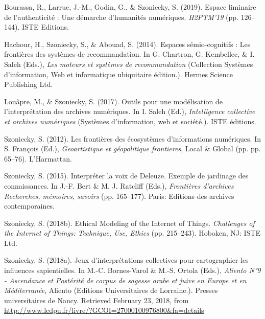 \documentclass[
  a4paper,
  DIV=11,
  numbers=noendperiod]{scrreprt}
\newlength{\cslhangindent}
\newenvironment{CSLReferences}[2] %
 {\begin{list}{}{%
  \setlength{\itemindent}{0pt}
  \setlength{\leftmargin}{0pt}
  \setlength{\parsep}{0pt}
  \ifodd #1
   \setlength{\leftmargin}{\cslhangindent}
   \setlength{\itemindent}{-1\cslhangindent}
  \fi
  \setlength{\itemsep}{#2\baselineskip}}}
 {\end{list}}
\begin{document}
\label{refs-chapitre}
\begin{CSLReferences}{1}{0}
Bourassa, R., Larrue, J.-M., Godin, G., \& Szoniecky, S. (2019). Espace
liminaire de l'authenticité : {Une} démarche d'humanités numériques.
\emph{{H2PTM}'19} (pp. 126--144). ISTE Editions.

Hachour, H., Szoniecky, S., \& Abouad, S. (2014). Espaces
sémio-cognitifs : Les frontières des systèmes de recommandation. In G.
Chartron, G. Kembellec, \& I. Saleh (Eds.), \emph{Les moteurs et
systèmes de recommandation} (Collection Systèmes d'information, Web et
informatique ubiquitaire édition.). Hermes Science Publishing Ltd.

Louâpre, M., \& Szoniecky, S. (2017). Outils pour une modélisation de
l'interprétation des archives numériques. In I. Saleh (Ed.),
\emph{Intelligence collective et archives numériques} (Systèmes
d'information, web et société.). ISTE éditions.

Szoniecky, S. (2012). Les frontières des écosystèmes d'informations
numériques. In S. François (Ed.), \emph{Geoartistique et géopolitique
frontieres}, Local \& {Global} (pp. pp. 65--76). L'Harmattan.

Szoniecky, S. (2015). Interpréter la voix de {Deleuze}. {Exemple} de
jardinage des connaissances. In J.-F. Bert \& M. J. Ratcliff (Eds.),
\emph{Frontières d'archives {Recherches}, mémoires, savoirs} (pp.
165--177). Paris: Editions des archives contemporaines.

Szoniecky, S. (2018b). Ethical {Modeling} of the {Internet} of {Things}.
\emph{Challenges of the {Internet} of {Things}: {Technique}, {Use},
{Ethics}} (pp. 215--243). Hoboken, NJ: ISTE Ltd.

Szoniecky, S. (2018a). Jeux d'interprétations collectives pour
cartographier les influences sapientielles. In M.-C. Bornes-Varol \&
M.-S. Ortola (Eds.), \emph{Aliento {N}°9 - {Ascendance} et {Postérité}
de corpus de sagesse arabe et juive en {Europe} et en {Méditerranée}},
Aliento (Editions Universitaires de Lorraine.). Presses universitaires
de Nancy. Retrieved February 23, 2018, from
\url{http://www.lcdpu.fr/livre/?GCOI=27000100976800&fa=details}


\end{CSLReferences}
\end{document}
